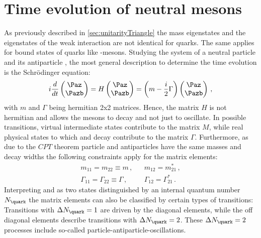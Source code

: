 \section[head={Time evolution of neutral mesons},tocentry={Time evolution of neutral mesons}]{Time evolution of neutral mesons}
\label{sec:TimeEvolution}

As previously described in \cref{sec:unitarityTriangle} the mass eigenstates and the eigenstates of the weak interaction are not identical for quarks.
The same applies for bound states of quarks like \B-mesons.
Studying the system of a neutral particle \Paz and its antiparticle \Pazb, the most general description to determine the time evolution is the Schrödinger equation:
\begin{equation}
i\frac{d}{dt}\begin{pmatrix} \Paz \\ \Pazb \end{pmatrix} = H \begin{pmatrix} \Paz \\ \Pazb \end{pmatrix}
=\left(m-\frac{i}{2}\Gamma\right)\begin{pmatrix} \Paz \\ \Pazb \end{pmatrix}\,, \label{eq:mixMatrix}
\end{equation}
with $m$ and $\Gamma$ being hermitian 2x2 matrices.
Hence, the matrix $H$ is not hermitian and allows the \B mesons to decay and not just to oscillate.
In possible transitions, virtual intermediate states contribute to the matrix $M$, while real physical states to which \Paz and \Pazb decay contribute to the matrix $\Gamma$.
Furthermore, as due to the $CPT$ theorem particle and antiparticles have the same masses and decay widths the following constraints apply for the matrix elements:
\begin{equation}
\begin{aligned}
&m_{11}=m_{22}\equiv m\,,&&m_{12}=m_{21}^\ast\,,&\\
&\Gamma_{11}=\Gamma_{22}\equiv\Gamma\,,&&\Gamma_{12}=\Gamma_{21}^\ast\,.&
\end{aligned}
\end{equation}
Interpreting \Paz and \Pazb as two states distinguished by an internal quantum number $N_\quark$ the matrix elements can also be classified by certain types of transitions:
Transitions with $\Delta N_\quark=1$ are driven by the diagonal elements, while the off diagonal elements describe transitions with $\Delta N_\quark=2$.
These $\Delta N_\quark=2$ processes include so-called particle-antiparticle-oscillations.


